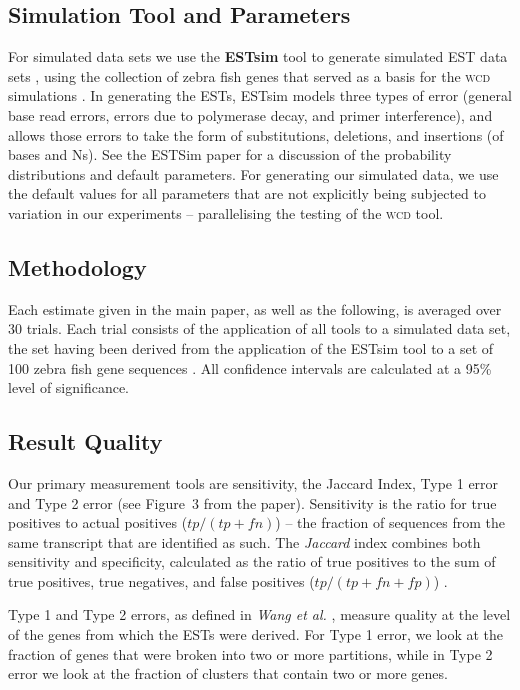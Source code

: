 \documentclass[a4paper,12pt]{article}
\newcommand{\mc}[1]{#1}   %
\begin{document}
\begin{appendix}
\subsection{Simulation Tool and Parameters}

For simulated data sets we use the {\bf ESTsim} tool to generate
simulated EST data sets \cite{Hazelhurst03}, using the collection of
zebra fish genes that served as a basis for the \textsc{wcd} simulations
\cite{Hazelhurst08a}.  In generating the ESTs, ESTsim models three
types of error (general base read errors, errors due to
polymerase decay, and primer interference), and allows those errors to
take the form of substitutions, deletions, and insertions (of bases
and Ns).  See the ESTSim paper for a discussion of the probability
distributions and default parameters.  For generating our simulated
data, we use the default values for all parameters that are not
explicitly being subjected to variation in our experiments --
parallelising the testing of the \textsc{wcd} tool.



\subsection{Methodology} 

Each estimate given in the main paper, as well as the following, is
averaged over 30 trials.  Each trial consists of the application of
all tools to a simulated data set, the set having been derived
from the application of the ESTsim tool to a set of 100 zebra fish
gene sequences \cite{Hazelhurst03}.  All confidence intervals are
calculated at a 95\% level of significance.

\subsection{Result Quality}

\mc{Our primary measurement tools are sensitivity, the Jaccard Index,
  Type 1 error and Type 2 error (see Figure~3 from the paper).
  Sensitivity is the ratio for true positives to actual positives ($tp
  / (tp + fn)$) -- the} fraction of sequences from the same transcript
that are identified as such.  The {\it Jaccard} index combines both
sensitivity and specificity, calculated as the ratio of true positives
to the sum of true positives, true negatives, and false positives ($tp
/ (tp+fn+fp)$) \cite{Hazelhurst08a}.

\mc{Type 1 and Type 2 errors, as defined in {\it Wang et al.}
\cite{Wang04}, measure quality at the level of the genes from which
the ESTs were derived.  For Type 1 error, we look at the fraction of genes
that were broken into two or more partitions, while in
Type 2 error we look at the fraction of clusters that contain two or
more genes.}


\end{appendix}
\end{document}
